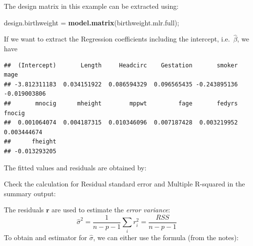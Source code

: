 \documentclass[
]{book}
\newenvironment{Shaded}{\begin{snugshade}}{\end{snugshade}}
\newcommand{\DecValTok}[1]{\textcolor[rgb]{0.00,0.00,0.81}{#1}}
\newcommand{\FunctionTok}[1]{\textcolor[rgb]{0.13,0.29,0.53}{\textbf{#1}}}
\newcommand{\NormalTok}[1]{#1}
\newcommand{\OtherTok}[1]{\textcolor[rgb]{0.56,0.35,0.01}{#1}}
\newcommand{\SpecialCharTok}[1]{\textcolor[rgb]{0.81,0.36,0.00}{\textbf{#1}}}
\begin{document}
The design matrix in this example can be extracted using:

\begin{Shaded}
\begin{Highlighting}[]
\NormalTok{design.birthweight }\OtherTok{=} \FunctionTok{model.matrix}\NormalTok{(birthweight.mlr.full);}
\end{Highlighting}
\end{Shaded}

If we want to extract the Regression coefficients including the intercept, i.e.~\(\hat{\beta}\), we have

\begin{Shaded}
\end{Shaded}

\begin{verbatim}
##  (Intercept)       Length     Headcirc    Gestation       smoker         mage 
## -3.812311183  0.034151922  0.086594329  0.096565435 -0.243895136 -0.019003806 
##       mnocig      mheight        mppwt         fage       fedyrs       fnocig 
##  0.001064074  0.004187315  0.010346096  0.007187428  0.003219952  0.003444674 
##      fheight 
## -0.013293205
\end{verbatim}

The fitted values and residuals are obtained by:

\begin{Shaded}
\end{Shaded}

Check the calculation for Residual standard error and Multiple R-squared in the summary output:

The residuals \(\mathbf{r}\) are used to estimate the \textit{error variance}:
\[\hat{\sigma}^2 = \frac{1}{n-p-1}\sum_i r_i^2 = \frac{RSS}{n-p-1}\]
To obtain and estimator for \(\hat{\sigma}\), we can either use the formula (from the notes):

\begin{Shaded}
\end{Shaded}
\end{document}
